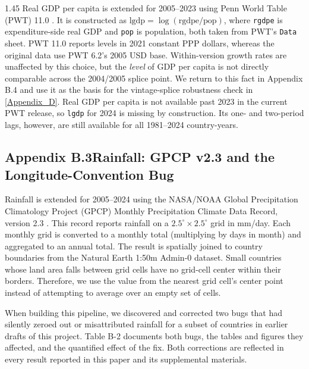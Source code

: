 \documentclass[12pt]{article}
\begin{document}
\begin{bibunit}[jpe]
\begin{spacing}{1.45}
Real GDP per capita is extended for 2005--2023 using Penn World Table (PWT) 11.0 \citep{feenstra2015pwt}. It is constructed as $\text{lgdp} = \log(\text{rgdpe}/\text{pop})$, where \texttt{rgdpe} is expenditure-side real GDP and \texttt{pop} is population, both taken from PWT's \texttt{Data} sheet. PWT 11.0 reports levels in 2021 constant PPP dollars, whereas the original \citeauthor{bruckner2011rain} data use PWT 6.2's 2005 USD base. Within-version growth rates are unaffected by this choice, but the \emph{level} of GDP per capita is not directly comparable across the 2004/2005 splice point. We return to this fact in Appendix B.4 and use it as the basis for the vintage-splice robustness check in \ref{Appendix_D}. Real GDP per capita is not available past 2023 in the current PWT release, so \texttt{lgdp} for 2024 is missing by construction. Its one- and two-period lags, however, are still available for all 1981--2024 country-years.

\subsection*{Appendix B.3\quad Rainfall: GPCP v2.3 and the Longitude-Convention Bug}

Rainfall is extended for 2005--2024 using the NASA/NOAA Global Precipitation Climatology Project (GPCP) Monthly Precipitation Climate Data Record, version 2.3 \citep{huffman1997gpcp}. This record reports rainfall on a $2.5^{\circ}\times2.5^{\circ}$ grid in mm/day. Each monthly grid is converted to a monthly total (multiplying by days in month) and aggregated to an annual total. The result is spatially joined to country boundaries from the Natural Earth 1:50m Admin-0 dataset. Small countries whose land area falls between grid cells have no grid-cell center within their borders. Therefore, we use the value from the nearest grid cell's center point instead of attempting to average over an empty set of cells.

When building this pipeline, we discovered and corrected two bugs that had silently zeroed out or misattributed rainfall for a subset of countries in earlier drafts of this project. Table B-2 documents both bugs, the tables and figures they affected, and the quantified effect of the fix. Both corrections are reflected in every result reported in this paper and its supplemental materials.


\end{spacing}
\end{bibunit}
\end{document}
